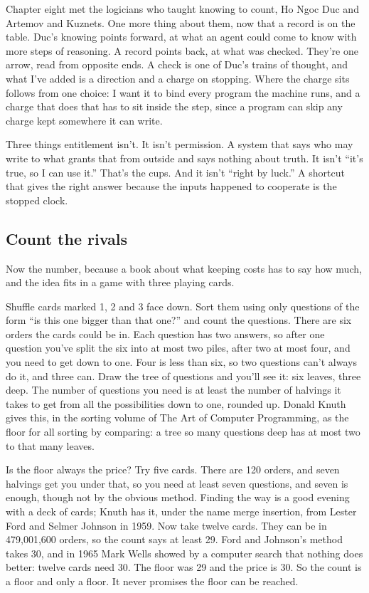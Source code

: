 \documentclass[11pt,twoside]{article}
\theoremstyle{thielethm}
\theoremstyle{thieledef}
\theoremstyle{thieledef}
\theoremstyle{thieledef}
\theoremstyle{thielethm}
\theoremstyle{thieleobs}
\theoremstyle{thielethm}
\begin{document}
Chapter eight met the logicians who taught knowing to count, Ho Ngoc Duc and Artemov and Kuznets. One more thing about them, now that a record is on the table. Duc's knowing points forward, at what an agent could come to know with more steps of reasoning. A record points back, at what was checked. They're one arrow, read from opposite ends. A check is one of Duc's trains of thought, and what I've added is a direction and a charge on stopping. Where the charge sits follows from one choice: I want it to bind every program the machine runs, and a charge that does that has to sit inside the step, since a program can skip any charge kept somewhere it can write.

Three things entitlement isn't. It isn't permission. A system that says who may write to what grants that from outside and says nothing about truth. It isn't ``it's true, so I can use it.'' That's the cups. And it isn't ``right by luck.'' A shortcut that gives the right answer because the inputs happened to cooperate is the stopped clock.

\subsection{Count the rivals}

Now the number, because a book about what keeping costs has to say how much, and the idea fits in a game with three playing cards.

Shuffle cards marked 1, 2 and 3 face down. Sort them using only questions of the form ``is this one bigger than that one?'' and count the questions. There are six orders the cards could be in. Each question has two answers, so after one question you've split the six into at most two piles, after two at most four, and you need to get down to one. Four is less than six, so two questions can't always do it, and three can. Draw the tree of questions and you'll see it: six leaves, three deep. The number of questions you need is at least the number of halvings it takes to get from all the possibilities down to one, rounded up. Donald Knuth gives this, in the sorting volume of The Art of Computer Programming, as the floor for all sorting by comparing: a tree so many questions deep has at most two to that many leaves.

Is the floor always the price? Try five cards. There are 120 orders, and seven halvings get you under that, so you need at least seven questions, and seven is enough, though not by the obvious method. Finding the way is a good evening with a deck of cards; Knuth has it, under the name merge insertion, from Lester Ford and Selmer Johnson in 1959. Now take twelve cards. They can be in 479,001,600 orders, so the count says at least 29. Ford and Johnson's method takes 30, and in 1965 Mark Wells showed by a computer search that nothing does better: twelve cards need 30. The floor was 29 and the price is 30. So the count is a floor and only a floor. It never promises the floor can be reached.
\end{document}
